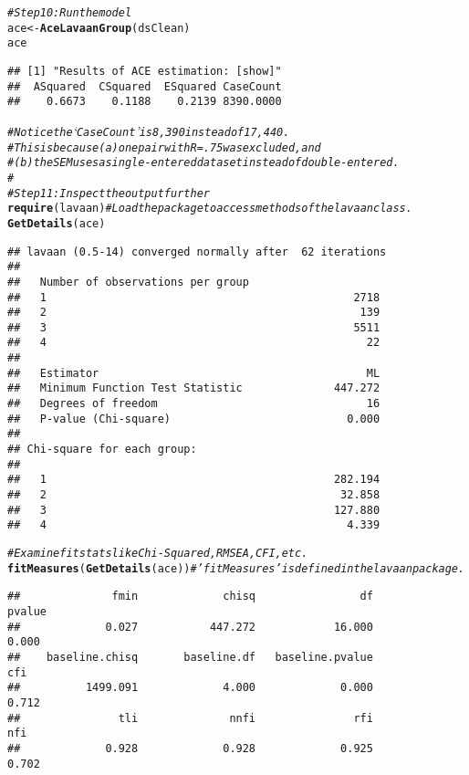 \documentclass{article}\usepackage[]{graphicx}\usepackage[]{color}
\makeatletter
\newcommand{\hlcom}[1]{\textcolor[rgb]{0.678,0.584,0.686}{\textit{#1}}}%
\newcommand{\hlstd}[1]{\textcolor[rgb]{0.345,0.345,0.345}{#1}}%
\newcommand{\hlkwb}[1]{\textcolor[rgb]{0.69,0.353,0.396}{#1}}%
\newcommand{\hlkwd}[1]{\textcolor[rgb]{0.737,0.353,0.396}{\textbf{#1}}}%
\newenvironment{kframe}{%
 \def\at@end@of@kframe{}%
 \ifinner\ifhmode%
  \def\at@end@of@kframe{\end{minipage}}%
  \begin{minipage}{\columnwidth}%
 \fi\fi%
 \def\FrameCommand##1{\hskip\@totalleftmargin \hskip-\fboxsep
 \colorbox{shadecolor}{##1}\hskip-\fboxsep
     \hskip-\linewidth \hskip-\@totalleftmargin \hskip\columnwidth}%
 \MakeFramed {\advance\hsize-\width
   \@totalleftmargin\z@ \linewidth\hsize
   \@setminipage}}%
 {\par\unskip\endMakeFramed%
 \at@end@of@kframe}
\newenvironment{knitrout}{}{} %
\makeatother
\begin{document}
\begin{knitrout}
\begin{kframe}
\begin{alltt}
\hlcom{#Step 10: Run the model}
\hlstd{ace} \hlkwb{<-} \hlkwd{AceLavaanGroup}\hlstd{(dsClean)}
\hlstd{ace}
\end{alltt}
\begin{verbatim}
## [1] "Results of ACE estimation: [show]"
##  ASquared  CSquared  ESquared CaseCount 
##    0.6673    0.1188    0.2139 8390.0000
\end{verbatim}
\begin{alltt}
\hlcom{#Notice the `CaseCount' is 8,390 instead of 17,440.}
\hlcom{#  This is because (a) one pair with R=.75 was excluded, and}
\hlcom{#  (b) the SEM uses a single-entered dataset instead of double-entered.}
\hlcom{#}
\hlcom{#Step 11: Inspect the output further}
\hlkwd{require}\hlstd{(lavaan)} \hlcom{#Load the package to access methods of the lavaan class.}
\hlkwd{GetDetails}\hlstd{(ace)}
\end{alltt}
\begin{verbatim}
## lavaan (0.5-14) converged normally after  62 iterations
## 
##   Number of observations per group         
##   1                                               2718
##   2                                                139
##   3                                               5511
##   4                                                 22
## 
##   Estimator                                         ML
##   Minimum Function Test Statistic              447.272
##   Degrees of freedom                                16
##   P-value (Chi-square)                           0.000
## 
## Chi-square for each group:
## 
##   1                                            282.194
##   2                                             32.858
##   3                                            127.880
##   4                                              4.339
\end{verbatim}
\begin{alltt}
\hlcom{#Examine fit stats like Chi-Squared, RMSEA, CFI, etc.}
\hlkwd{fitMeasures}\hlstd{(}\hlkwd{GetDetails}\hlstd{(ace))} \hlcom{#'fitMeasures' is defined in the lavaan package.}
\end{alltt}
\begin{verbatim}
##              fmin             chisq                df            pvalue 
##             0.027           447.272            16.000             0.000 
##    baseline.chisq       baseline.df   baseline.pvalue               cfi 
##          1499.091             4.000             0.000             0.712 
##               tli              nnfi               rfi               nfi 
##             0.928             0.928             0.925             0.702 

\end{verbatim}
\end{kframe}
\end{knitrout}
\end{document}
